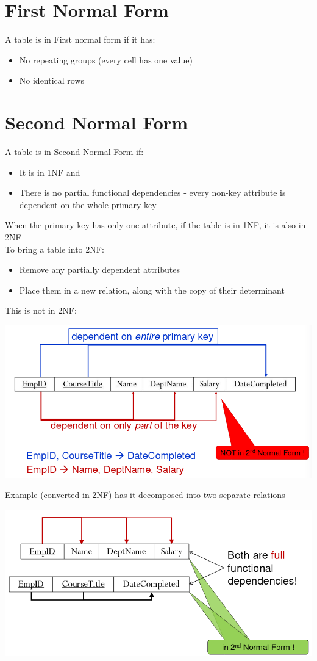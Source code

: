 \documentclass{article}[18pt]
\begin{document}
\section{First Normal Form}
A table is in First normal form if it has:
\begin{itemize}
	\item No repeating groups (every cell has one value)
	\item No identical rows
\end{itemize}
\section{Second Normal Form}
A table is in Second Normal Form if:
\begin{itemize}
	\item It is in 1NF and
	\item There is no partial functional dependencies - every non-key attribute is dependent on the whole primary key
\end{itemize}
When the primary key has only one attribute, if the table is in 1NF, it is also in 2NF\\
To bring a table into 2NF:
\begin{itemize}
	\item Remove any partially dependent attributes
	\item Place them in a new relation, along with the copy of their determinant
\end{itemize}
This is not in 2NF:
\begin{center}
	\includegraphics[scale=0.7]{2NF}
\end{center}
Example (converted in 2NF) has it decomposed into two separate relations
\begin{center}
	\includegraphics[scale=0.7]{2NF1}
\end{center}
\end{document}
